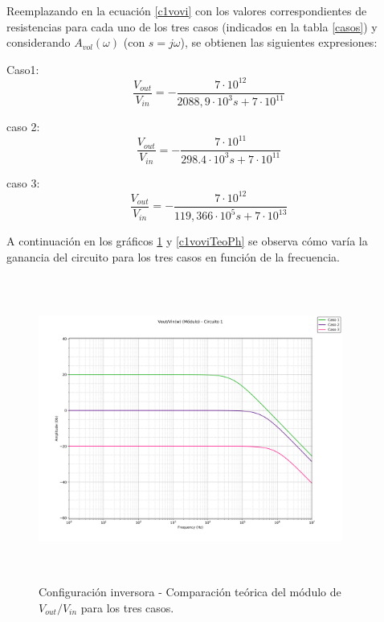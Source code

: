 Reemplazando en la ecuaci\'on \ref{c1vovi} con los valores correspondientes de resistencias para cada uno de los tres casos (indicados en la tabla \ref{casos}) y  considerando $A_{vol}(\omega)$ (con $s = j\omega$), se obtienen las siguientes expresiones:

Caso1:
\begin{equation}
	\frac{V_{out}}{V_{in}} = - \frac{7\cdot10^{12}}{2088,9 \cdot 10^3 s + 7 \cdot 10^{11}}
	\label{c1c1vovi}
\end{equation}

caso 2:
\begin{equation}
	\frac{V_{out}}{V_{in}} = - \frac{7 \cdot 10^{11}}{298.4 \cdot 10^{3} s +7 \cdot 10^{11}}
	\label{c1c2vovi}
\end{equation}

caso 3:
\begin{equation}
	\frac{V_{out}}{V_{in}} = - \frac{7 \cdot 10^{12}}{119,366 \cdot 10^{5} s +7 \cdot 10^{13}}
	\label{c1c3vovi}
\end{equation}

A continuaci\'on en los gr\'aficos \ref{c1voviTeoMod} y \ref{c1voviTeoPh} se observa c\'omo var\'ia la ganancia del circuito para los tres casos en funci\'on de la frecuencia.

\begin{figure}[H] %
	\centering
	\includegraphics[width=10cm,height=10cm,keepaspectratio]{../EJ1/00GRAFICOS/teoricos/circ1voviw.png}
	\caption{Configuración inversora - Comparaci\'on te\'orica del m\'odulo de $V_{out}/V_{in}$ para los tres casos.}
	\label{c1voviTeoMod}
\end{figure}

